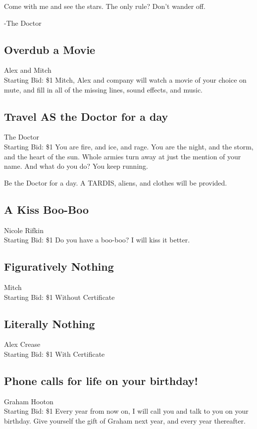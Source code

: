 \documentclass[11pt]{article}
\begin{document}
Come with me and see the stars. The only rule? Don't wander off.

-The Doctor
\subsection{Overdub a Movie}
Alex and Mitch
\\
Starting Bid: \$1
\newline
Mitch, Alex and company will watch a movie of your choice on mute, and fill in all of the missing lines, sound effects, and music.
\subsection{Travel AS the Doctor for a day}
The Doctor
\\
Starting Bid: \$1
\newline
You are fire, and ice, and rage. You are the night, and the storm, and the heart of the sun. Whole armies turn away at just the mention of your name. And what do you do? You keep running.

Be the Doctor for a day. A TARDIS, aliens, and clothes will be provided.
\subsection{A Kiss Boo-Boo}
Nicole Rifkin
\\
Starting Bid: \$1
\newline
Do you have a boo-boo? I will kiss it better.
\subsection{Figuratively Nothing}
Mitch
\\
Starting Bid: \$1
\newline
Without Certificate
\subsection{Literally Nothing}
Alex Crease
\\
Starting Bid: \$1
\newline
With Certificate
\subsection{Phone calls for life on your birthday!}
Graham Hooton
\\
Starting Bid: \$1
\newline
Every year from now on, I will call you and talk to you on your birthday. Give yourself the gift of Graham next year, and every year thereafter.
\end{document}
